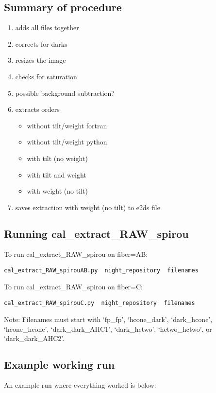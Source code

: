 \subsection{Summary of procedure}
\begin{enumerate}
\item adds all files together
\item corrects for darks
\item resizes the image
\item checks for saturation
\item possible background subtraction?
\item extracts orders
	\begin{itemize}
		\item without tilt/weight fortran
		\item without tilt/weight python
		\item with tilt (no weight)
		\item with tilt and weight
		\item with weight (no tilt)
	\end{itemize}
\item saves extraction with weight (no tilt) to e2ds file
\end{enumerate}

\subsection{Running cal\_extract\_RAW\_spirou}

To run cal\_extract\_RAW\_spirou on fiber=AB:
\begin{lstlisting}[language=bash, style=bashstyle]
cal_extract_RAW_spirouAB.py  night_repository  filenames
\end{lstlisting}
To run cal\_extract\_RAW\_spirou on fiber=C:
\begin{lstlisting}[language=bash, style=bashstyle]
cal_extract_RAW_spirouC.py  night_repository  filenames
\end{lstlisting}

Note: Filenames must start with `fp\_fp', `hcone\_dark', `dark\_hcone', `hcone\_hcone', `dark\_dark\_AHC1', `dark\_hctwo', `hctwo\_hctwo', or `dark\_dark\_AHC2'.


\subsection{Example working run}

An example run where everything worked is below:

